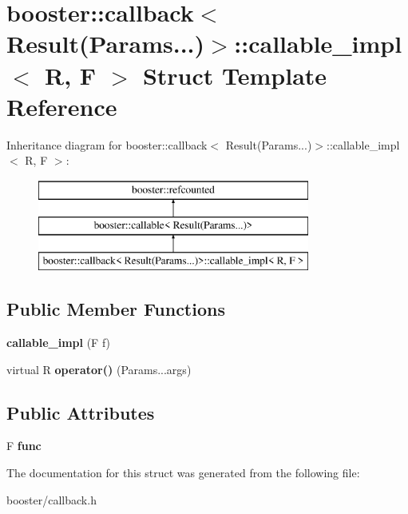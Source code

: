 \section{booster\+:\+:callback$<$ Result(Params...)$>$\+:\+:callable\+\_\+impl$<$ R, F $>$ Struct Template Reference}
\label{structbooster_1_1callback_3_01Result_07Params_8_8_8_08_4_1_1callable__impl}
Inheritance diagram for booster\+:\+:callback$<$ Result(Params...)$>$\+:\+:callable\+\_\+impl$<$ R, F $>$\+:\begin{figure}[H]
\begin{center}
\leavevmode
\includegraphics[height=3.000000cm]{structbooster_1_1callback_3_01Result_07Params_8_8_8_08_4_1_1callable__impl}
\end{center}
\end{figure}
\subsection*{Public Member Functions}
\begin{DoxyCompactItemize}
\item 
{\bfseries callable\+\_\+impl} (F f)\label{structbooster_1_1callback_3_01Result_07Params_8_8_8_08_4_1_1callable__impl_a4175590398e9a72e2eeda859e10001ae}

\item 
virtual R {\bfseries operator()} (Params...\+args)\label{structbooster_1_1callback_3_01Result_07Params_8_8_8_08_4_1_1callable__impl_ae1eb421b84a20c3135520be172caa246}

\end{DoxyCompactItemize}
\subsection*{Public Attributes}
\begin{DoxyCompactItemize}
\item 
F {\bfseries func}\label{structbooster_1_1callback_3_01Result_07Params_8_8_8_08_4_1_1callable__impl_a37c8cf1f67888504410df2628a8bb539}

\end{DoxyCompactItemize}


The documentation for this struct was generated from the following file\+:\begin{DoxyCompactItemize}
\item 
booster/callback.\+h\end{DoxyCompactItemize}
